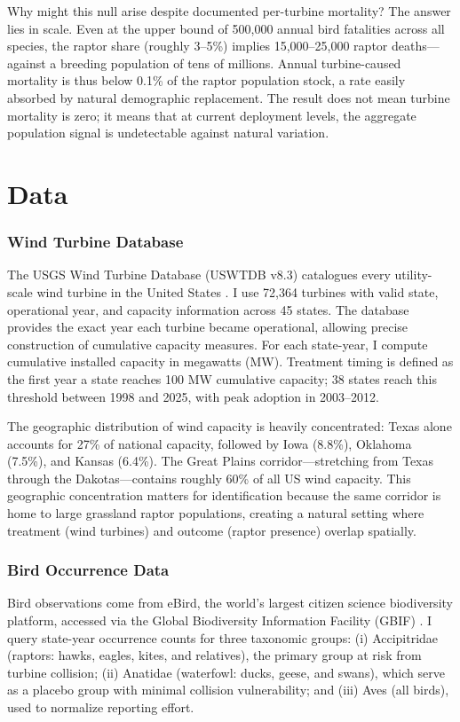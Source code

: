 \documentclass[12pt]{article}
\begin{document}
Why might this null arise despite documented per-turbine mortality? The answer lies in scale. Even at the upper bound of 500,000 annual bird fatalities across all species, the raptor share (roughly 3--5\%) implies 15,000--25,000 raptor deaths---against a breeding population of tens of millions. Annual turbine-caused mortality is thus below 0.1\% of the raptor population stock, a rate easily absorbed by natural demographic replacement. The result does not mean turbine mortality is zero; it means that at current deployment levels, the aggregate population signal is undetectable against natural variation.

\section{Data}

\subsubsection*{Wind Turbine Database} The USGS Wind Turbine Database (USWTDB v8.3) catalogues every utility-scale wind turbine in the United States \citep{uswtdb2024}. I use 72,364 turbines with valid state, operational year, and capacity information across 45 states. The database provides the exact year each turbine became operational, allowing precise construction of cumulative capacity measures. For each state-year, I compute cumulative installed capacity in megawatts (MW). Treatment timing is defined as the first year a state reaches 100 MW cumulative capacity; 38 states reach this threshold between 1998 and 2025, with peak adoption in 2003--2012.

The geographic distribution of wind capacity is heavily concentrated: Texas alone accounts for 27\% of national capacity, followed by Iowa (8.8\%), Oklahoma (7.5\%), and Kansas (6.4\%). The Great Plains corridor---stretching from Texas through the Dakotas---contains roughly 60\% of all US wind capacity. This geographic concentration matters for identification because the same corridor is home to large grassland raptor populations, creating a natural setting where treatment (wind turbines) and outcome (raptor presence) overlap spatially.

\subsubsection*{Bird Occurrence Data} Bird observations come from eBird, the world's largest citizen science biodiversity platform, accessed via the Global Biodiversity Information Facility (GBIF) \citep{sullivan2009ebird, gbif2024ebird}. I query state-year occurrence counts for three taxonomic groups: (i) Accipitridae (raptors: hawks, eagles, kites, and relatives), the primary group at risk from turbine collision; (ii) Anatidae (waterfowl: ducks, geese, and swans), which serve as a placebo group with minimal collision vulnerability; and (iii) Aves (all birds), used to normalize reporting effort.
\end{document}
